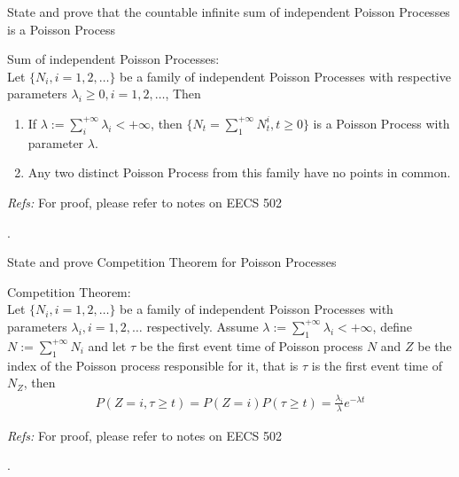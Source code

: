 \documentclass[11pt]{article}
\newcommand{\refs}[1]{{\scriptsize\textit{Refs: }#1\par}\hfill.}
\newcommand*{\xfield}[1]{\begin{mdframed}\centering #1\end{mdframed}\bigskip}
\newenvironment{field}{}{}
\newenvironment{note}{}{}
\begin{document}
%
\begin{note}
  \xfield{State and prove that the countable infinite sum of independent Poisson
    Processes is a Poisson Process}
  \begin{field}
    Sum of independent Poisson Processes:\\

    Let \(\{N_i, i = 1,2,\ldots\}\) be a family of independent Poisson
    Processes with respective parameters \(\lambda_i \geq 0, i =
    1,2,\ldots\), Then
    \begin{enumerate}
    \item If \(\lambda := \sum_i^{+\infty} \lambda_i < +\infty\), then
      \(\{N_t = \sum_1^{+\infty} N^i_t, t \geq 0\}\) is a Poisson
      Process with parameter \(\lambda\).
    \item Any two distinct Poisson Process from this family have no
      points in common.
    \end{enumerate}
    \refs{For proof, please refer to notes on EECS 502}
  \end{field}
\end{note}
%
\begin{note}
  \xfield{State and prove Competition Theorem for Poisson Processes}
  \begin{field}
    Competition Theorem:\\

    Let \(\{N_i, i = 1,2,\ldots\}\) be a family of independent Poisson
    Processes with parameters \(\lambda_i, i = 1,2,\ldots\)
    respectively. Assume \(\lambda := \sum_1^{+\infty} \lambda_i <
    +\infty\), define \(N := \sum_1^{+\infty} N_i\) and let \(\tau\)
    be the first event time of Poisson process \(N\) and \(Z\) be the
    index of the Poisson process responsible for it, that is \(\tau\)
    is the first event time of \(N_Z\), then
    \begin{align*}
      P(Z=i, \tau \geq t) = P(Z = i) P(\tau \geq t) =
      \frac{\lambda_i}{\lambda} e^{-\lambda t}
    \end{align*}
    \refs{For proof, please refer to notes on EECS 502}
  \end{field}
\end{note}
\end{document}
